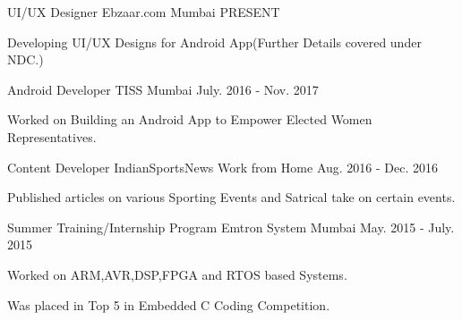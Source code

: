 

\begin{cventries}

  \cventry
    {UI/UX Designer} %
    {Ebzaar.com} %
    {Mumbai} %
    {PRESENT} %
    {
      \begin{cvitems} %
        \item {Developing UI/UX Designs for Android App(Further Details covered under NDC.)}
      \end{cvitems}
    }

  \cventry
    {Android Developer} %
    {TISS} %
    {Mumbai} %
    {July. 2016 - Nov. 2017} %
    {
      \begin{cvitems} %
        \item {Worked on Building an Android App to Empower Elected Women Representatives.}
      \end{cvitems}
    }

  \cventry
    {Content Developer} %
    {IndianSportsNews} %
    {Work from Home} %
    {Aug. 2016 - Dec. 2016} %
    {
      \begin{cvitems} %
        \item {Published articles on various Sporting Events and Satrical take on certain events.}
      \end{cvitems}
    }

  \cventry
    {Summer Training/Internship Program} %
    {Emtron System} %
    {Mumbai} %
    {May. 2015 - July. 2015} %
    {
      \begin{cvitems} %
        \item {Worked on ARM,AVR,DSP,FPGA and RTOS based Systems.}
        \item {Was placed in Top 5 in Embedded C Coding Competition.}
      \end{cvitems}
    }
\end{cventries}

